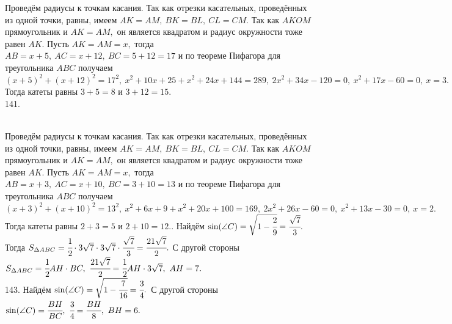 \documentclass[12pt]{article}
\begin{document}
Проведём радиусы к точкам касания. Так как отрезки касательных, проведённых из одной точки, равны, имеем $AK=AM,\ BK=BL,\ CL=CM.$ Так как $AKOM$ прямоугольник и $AK=AM,$ он является квадратом и радиус окружности тоже равен $AK.$ Пусть $AK=AM=x,$ тогда $AB=x+5,\ AC=x+12,\ BC=5+12=17$ и по теореме Пифагора для треугольника $ABC$ получаем $(x+5)^2+(x+12)^2=17^2,\ x^2+10x+25+x^2+24x+144=289,\ 2x^2+34x-120=0,\ x^2+17x-60=0,\ x=3.$ Тогда катеты равны $3+5=8$ и $3+12=15.$\\
141. \begin{figure}[ht!]
\end{figure}\\
Проведём радиусы к точкам касания. Так как отрезки касательных, проведённых из одной точки, равны, имеем $AK=AM,\ BK=BL,\ CL=CM.$ Так как $AKOM$ прямоугольник и $AK=AM,$ он является квадратом и радиус окружности тоже равен $AK.$ Пусть $AK=AM=x,$ тогда $AB=x+3,\ AC=x+10,\ BC=3+10=13$ и по теореме Пифагора для треугольника $ABC$ получаем $(x+3)^2+(x+10)^2=13^2,\ x^2+6x+9+x^2+20x+100=169,\ 2x^2+26x-60=0,\ x^2+13x-30=0,\ x=2.$ Тогда катеты равны $2+3=5$ и $2+10=12.$\newpage{}. Найдём $\sin(\angle C)=\sqrt{1-\cfrac{2}{9}}=\cfrac{\sqrt{7}}{3}.$ Тогда $S_{\Delta ABC}=\cfrac{1}{2}\cdot3\sqrt{7}\cdot3\sqrt{7}\cdot\cfrac{\sqrt{7}}{3}=
\cfrac{21\sqrt{7}}{2}.$ С другой стороны $S_{\Delta ABC}=\cfrac{1}{2}AH\cdot BC,\ \cfrac{21\sqrt{7}}{2}=\cfrac{1}{2}AH\cdot3\sqrt{7},\ AH=7.$\\
143. Найдём $\sin(\angle C)=\sqrt{1-\cfrac{7}{16}}=\cfrac{3}{4}.$ С другой стороны $\sin(\angle C)=\cfrac{BH}{BC},\ \cfrac{3}{4}=\cfrac{BH}{8},\ BH=6.$ \\
\end{document}
